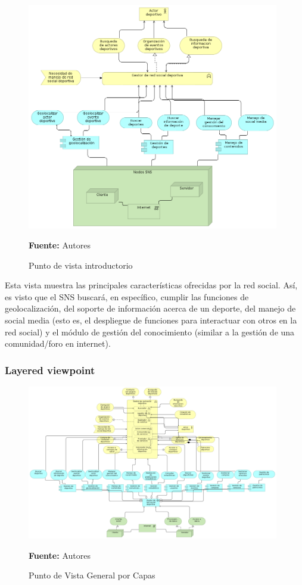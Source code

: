 \begin{figure}[!htb]
  \begin{center}
    \includegraphics[width=11cm]{./imagenes/introductory.png}
    \caption{Punto de vista introductorio}
    \label{fig:introductory}
    \textbf{Fuente:}  Autores
  \end{center}
\end{figure}

Esta vista muestra las principales características ofrecidas por la red social. Así, es visto que el SNS buscará, en específico, cumplir las funciones de geolocalización, del soporte de información acerca de un deporte, del manejo de social media (esto es, el despliegue de funciones para interactuar con otros en la red social) y el módulo de gestión del conocimiento (similar a la gestión de una comunidad/foro en internet).

\subsubsection{Layered viewpoint}

\begin{figure}[!htb]
  \begin{center}
    \includegraphics[width=11cm]{./imagenes/generallayered.png}
    \caption{Punto de Vista General por Capas}
    \label{fig:general_layered}
    \textbf{Fuente:}  Autores
  \end{center}
\end{figure}

